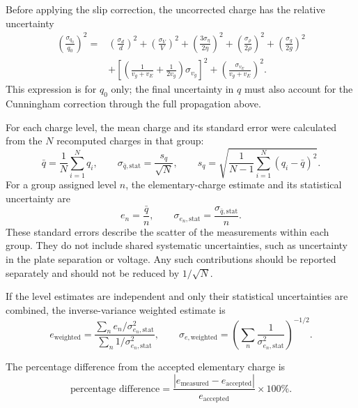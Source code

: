 \documentclass[12pt,a4paper]{article}
\begin{document}
Before applying the slip correction, the uncorrected charge has the relative
uncertainty
\begin{align}
    \left(\frac{\sigma_{q_0}}{q_0}\right)^2 ={}&
    \left(\frac{\sigma_d}{d}\right)^2
    +\left(\frac{\sigma_V}{V}\right)^2
    +\left(\frac{3\sigma_\eta}{2\eta}\right)^2
    +\left(\frac{\sigma_\rho}{2\rho}\right)^2
    +\left(\frac{\sigma_g}{2g}\right)^2 \nonumber\\
    &+\left[
        \left(
            \frac{1}{v_g+v_E}+\frac{1}{2v_g}
        \right)\sigma_{v_g}
    \right]^2
    +\left(\frac{\sigma_{v_E}}{v_g+v_E}\right)^2 .
    \label{eq:uncorrected-charge-uncertainty}
\end{align}
This expression is for $q_0$ only; the final uncertainty in $q$ must also
account for the Cunningham correction through the full propagation above.

For each charge level, the mean charge and its standard error were calculated
from the $N$ recomputed charges in that group:
\begin{equation}
    \bar{q} = \frac{1}{N}\sum_{i=1}^{N}q_i,
    \qquad
    \sigma_{\bar{q},\mathrm{stat}} =
    \frac{s_q}{\sqrt{N}},
    \qquad
    s_q =
    \sqrt{\frac{1}{N-1}\sum_{i=1}^{N}(q_i-\bar{q})^2}.
\end{equation}
For a group assigned level $n$, the elementary-charge estimate and its
statistical uncertainty are
\begin{equation}
    e_n = \frac{\bar{q}}{n},
    \qquad
    \sigma_{e_n,\mathrm{stat}} = \frac{\sigma_{\bar{q},\mathrm{stat}}}{n}.
\end{equation}
These standard errors describe the scatter of the measurements within each
group. They do not include shared systematic uncertainties, such as
uncertainty in the plate separation or voltage. Any such contributions
should be reported separately and should not be reduced by $1/\sqrt{N}$.

If the level estimates are independent and only their statistical
uncertainties are combined, the inverse-variance weighted estimate is
\begin{equation}
    e_{\mathrm{weighted}} =
    \frac{\displaystyle\sum_n e_n/\sigma_{e_n,\mathrm{stat}}^2}
         {\displaystyle\sum_n 1/\sigma_{e_n,\mathrm{stat}}^2},
    \qquad
    \sigma_{e,\mathrm{weighted}} =
    \left(\sum_n \frac{1}{\sigma_{e_n,\mathrm{stat}}^2}\right)^{-1/2}.
\end{equation}

The percentage difference from the accepted elementary charge is
\begin{equation}
    \text{percentage difference} =
    \frac{|e_{\mathrm{measured}}-e_{\mathrm{accepted}}|}
         {e_{\mathrm{accepted}}}\times100\%.
\end{equation}
\end{document}
